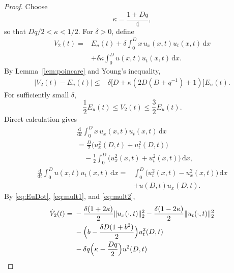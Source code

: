 \documentclass{IEEEtran}
\theoremstyle{definition}
\begin{document}
\begin{proof}
Choose
\begin{equation}
 \kappa=\frac{1+Dq}{4},
\label{eq:kappa}
\end{equation}
so that $Dq/2<\kappa<1/2$. For $\delta>0$, define
\begin{equation}
\begin{aligned}
 V_2(t)={}&E_u(t)+\delta\int_0^D x\,u_x(x,t)u_t(x,t)\,\mathrm dx\\
 &+\delta\kappa\int_0^D u(x,t)u_t(x,t)\,\mathrm dx.
\end{aligned}
\label{eq:V2}
\end{equation}
By Lemma~\ref{lem:poincare} and Young's inequality,
\begin{equation}
\begin{aligned}
 |V_2(t)-E_u(t)|\leq{}&\delta\bigl[D+\kappa(2D(D+q^{-1})+1)\bigr]E_u(t).
\end{aligned}
\label{eq:V2difference}
\end{equation}
For sufficiently small $\delta$,
\begin{equation}
 \frac12 E_u(t)\leq V_2(t)\leq\frac32 E_u(t).
\label{eq:V2_equiv}
\end{equation}
Direct calculation gives
\begin{equation}
\begin{aligned}
 &\frac{\mathrm d}{\mathrm dt}\int_0^D x\,u_x(x,t)u_t(x,t)\,\mathrm dx\\
 &=\frac D2\bigl(u_x^2(D,t)+u_t^2(D,t)\bigr)\\
 &\quad-\frac12\int_0^D\bigl(u_x^2(x,t)+u_t^2(x,t)\bigr)\,\mathrm dx,
\end{aligned}
\label{eq:mult1}
\end{equation}
\begin{equation}
\begin{aligned}
\frac{\mathrm d}{\mathrm dt}\int_0^D u(x,t)u_t(x,t)\,\mathrm dx
={}&\int_0^D\bigl(u_t^2(x,t)-u_x^2(x,t)\bigr)\,\mathrm dx\\
 &+u(D,t)u_x(D,t).
\end{aligned}
\label{eq:mult2}
\end{equation}
By \eqref{eq:EuDot}, \eqref{eq:mult1}, and
\eqref{eq:mult2},
\begin{equation}
\begin{aligned}
\dot V_2(t)={}&-\frac{\delta(1+2\kappa)}2\|u_x(\cdot,t)\|_2^2
 -\frac{\delta(1-2\kappa)}2\|u_t(\cdot,t)\|_2^2\\
 &-\Bigl(b-\frac{\delta D(1+b^2)}2\Bigr)u_t^2(D,t)\\
 &-\delta q\Bigl(\kappa-\frac{Dq}{2}\Bigr)u^2(D,t)\\

\end{aligned}
\end{equation}
\end{proof}
\end{document}

